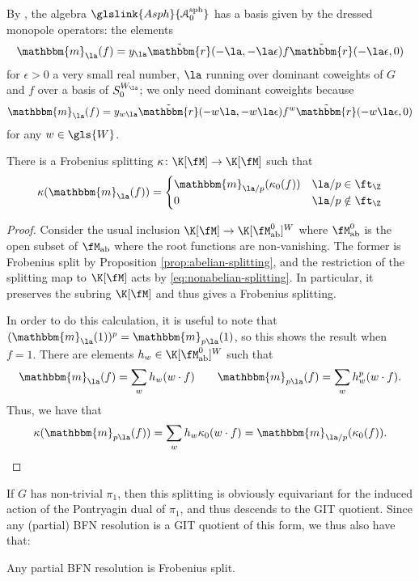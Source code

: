 By \cite[Prop. 3.14]{WebSD}, the algebra  $\glslink{Asph}{\EuScript{A}_0^{\operatorname{sph}}}$ has a basis given by the dressed monopole operators: the elements \[\mathbbm{m}_{\la}(f)=y_{\la}\tilde{\mathbbm{r}}(-\la, -\la\epsilon) f \tilde{\mathbbm{r}}(-\la \epsilon,0)\] for $\epsilon>0$ a very small real number, $\la$ running over dominant coweights of $G$ and $f$ over a basis of $S_0^{W_\la}$;
we only need dominant coweights because \[\mathbbm{m}_{\la}(f) =y_{w\la}\tilde{\mathbbm{r}}(-w\la,-w\la \epsilon) f^w \tilde{\mathbbm{r}}(-w\la \epsilon,0)\] for any $w\in \gls{W}$.

\begin{proposition}\label{prop:nonabelian-splitting}
  There is a Frobenius splitting $\kappa\colon \K[\fM]\to \K[\fM]$ such that
  \begin{equation}
    \kappa(\mathbbm{m}_{\la}(f))=
    \begin{cases}
      \mathbbm{m}_{\la/p}(\kappa_0(f)) & \la/p\in \ft_\Z\\
      0 & \la/p\notin \ft_\Z
    \end{cases}\label{eq:nonabelian-splitting}
  \end{equation}
\end{proposition}
\begin{proof}
  Consider the usual inclusion $\K[\fM]\to \K[\fM_{\operatorname{ab}}^0]^W$ where $\fM_{\operatorname{ab}}^0$ is the open subset of $\fM_{\operatorname{ab}}$ where the root functions are non-vanishing.    The former is Frobenius split by Proposition \ref{prop:abelian-splitting}, and the restriction of the splitting map to $\K[\fM]$ acts by \eqref{eq:nonabelian-splitting}.  In particular, it preserves the subring $\K[\fM]$ and thus gives a Frobenius splitting.

  In order to do this calculation, it is useful to note that $(\mathbbm{m}_{\la}(1))^p=\mathbbm{m}_{p\la}(1)$, so this shows the result when $f=1$.  There are elements $h_w\in  \K[\fM_{\operatorname{ab}}^0]^W$ such that
  \[\mathbbm{m}_{\la}(f)=\sum_w h_w (w\cdot f)\qquad \mathbbm{m}_{p\la}(f)=\sum_w h_w^p(w\cdot f) .\]  Thus, we have that \[\kappa(\mathbbm{m}_{p\la}(f))=\sum_w h_w \kappa_0(w\cdot f)=\mathbbm{m}_{\la/p}(\kappa_0(f)).\qedhere \]
\end{proof}
If $G$ has non-trivial $\pi_1$, then this splitting is obviously equivariant for the induced action of the Pontryagin dual of $\pi_1$, and thus descends to the GIT quotient.  Since any (partial) BFN resolution is a GIT quotient of this form, we thus also have that:
\begin{corollary}\label{cor:BFN-split}
  Any partial BFN resolution is Frobenius split.  
\end{corollary}




